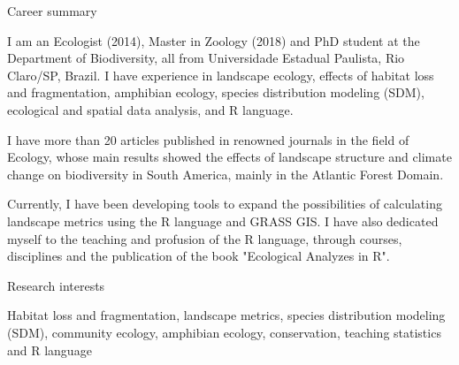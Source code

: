 \documentclass{resume}
\begin{document}

\begin{rSection}{Career summary}

I am an Ecologist (2014), Master in Zoology (2018) and PhD student at the Department of Biodiversity, all from Universidade Estadual Paulista, Rio Claro/SP, Brazil. I have experience in landscape ecology, effects of habitat loss and fragmentation, amphibian ecology, species distribution modeling (SDM), ecological and spatial data analysis, and R language. 

I have more than 20 articles published in renowned journals in the field of Ecology, whose main results showed the effects of landscape structure and climate change on biodiversity in South America, mainly in the Atlantic Forest Domain. 

Currently, I have been developing tools to expand the possibilities of calculating landscape metrics using the R language and GRASS GIS. I have also dedicated myself to the teaching and profusion of the R language, through courses, disciplines and the publication of the book "Ecological Analyzes in R".

\end{rSection}


\begin{rSection}{Research interests}

Habitat loss and fragmentation, landscape metrics, species distribution modeling (SDM), community ecology, amphibian ecology, conservation, teaching statistics and R language

\end{rSection}

\end{document}
